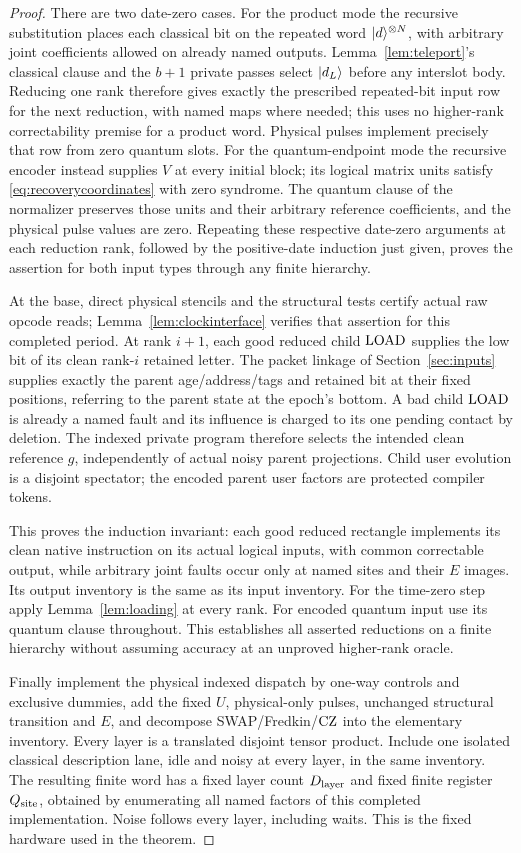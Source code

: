 \begin{proof}
There are two date-zero cases. For the product mode the recursive substitution places each classical bit on the repeated word $\lvert d\rangle^{\otimes N}$, with arbitrary joint coefficients allowed on already named outputs. Lemma~\ref{lem:teleport}'s classical clause and the $b+1$ private passes select $\lvert d_L\rangle$ before any interslot body. Reducing one rank therefore gives exactly the prescribed repeated-bit input row for the next reduction, with named maps where needed; this uses no higher-rank correctability premise for a product word. Physical pulses implement precisely that row from zero quantum slots. For the quantum-endpoint mode the recursive encoder instead supplies $V$ at every initial block; its logical matrix units satisfy \eqref{eq:recoverycoordinates} with zero syndrome. The quantum clause of the normalizer preserves those units and their arbitrary reference coefficients, and the physical pulse values are zero. Repeating these respective date-zero arguments at each reduction rank, followed by the positive-date induction just given, proves the assertion for both input types through any finite hierarchy.

At the base, direct physical stencils and the structural tests certify actual raw opcode reads; Lemma~\ref{lem:clockinterface} verifies that assertion for this completed period. At rank $i+1$, each good reduced child $\operatorname{LOAD}$ supplies the low bit of its clean rank-$i$ retained letter. The packet linkage of Section~\ref{sec:inputs} supplies exactly the parent age/address/tags and retained bit at their fixed positions, referring to the parent state at the epoch's bottom. A bad child $\operatorname{LOAD}$ is already a named fault and its influence is charged to its one pending contact by deletion. The indexed private program therefore selects the intended clean reference $g$, independently of actual noisy parent projections. Child user evolution is a disjoint spectator; the encoded parent user factors are protected compiler tokens.

This proves the induction invariant: each good reduced rectangle implements its clean native instruction on its actual logical inputs, with common correctable output, while arbitrary joint faults occur only at named sites and their $E$ images. Its output inventory is the same as its input inventory. For the time-zero step apply Lemma~\ref{lem:loading} at every rank. For encoded quantum input use its quantum clause throughout. This establishes all asserted reductions on a finite hierarchy without assuming accuracy at an unproved higher-rank oracle.

Finally implement the physical indexed dispatch by one-way controls and exclusive dummies, add the fixed $U$, physical-only pulses, unchanged structural transition and $E$, and decompose SWAP/Fredkin/$\operatorname{CZ}$ into the elementary inventory. Every layer is a translated disjoint tensor product. Include one isolated classical description lane, idle and noisy at every layer, in the same inventory. The resulting finite word has a fixed layer count $D_{\rm layer}$ and fixed finite register $Q_{\rm site}$, obtained by enumerating all named factors of this completed implementation. Noise follows every layer, including waits. This is the fixed hardware used in the theorem.
\end{proof}
